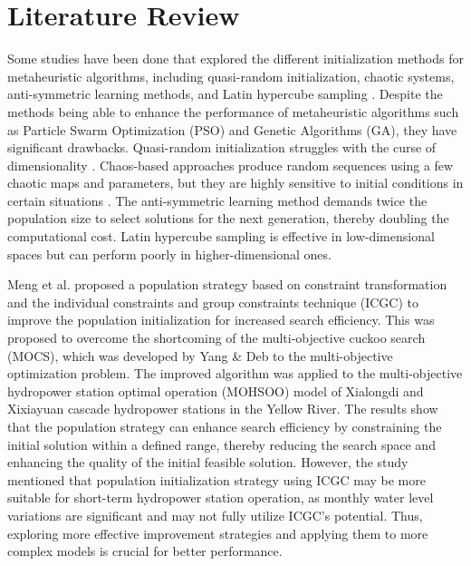 \section{Literature Review}
Some studies have been done that explored the different initialization methods for metaheuristic algorithms, including quasi-random initialization, chaotic systems, anti-symmetric learning methods, and Latin hypercube sampling \cite{li2020influence}. Despite the methods being able to enhance the performance of metaheuristic algorithms such as Particle Swarm Optimization (PSO) and Genetic Algorithms (GA), they have significant drawbacks. Quasi-random initialization struggles with the curse of dimensionality \cite{maaranen2004quasi}. Chaos-based approaches produce random sequences using a few chaotic maps and parameters, but they are highly sensitive to initial conditions in certain situations \cite{dos2008use}. The anti-symmetric learning method demands twice the population size to select solutions for the next generation, thereby doubling the computational cost. Latin hypercube sampling is effective in low-dimensional spaces but can perform poorly in higher-dimensional ones.

Meng et al. \cite{meng2019multi} proposed a population strategy based on constraint transformation and the individual constraints and group constraints technique (ICGC) to improve the population initialization for increased search efficiency. This was proposed to overcome the shortcoming of the multi-objective cuckoo search (MOCS), which was developed by Yang \& Deb \cite{yang2013multiobjective} to the multi-objective optimization problem. The improved algorithm was applied to the multi-objective hydropower station optimal operation (MOHSOO) model of Xialongdi and Xixiayuan cascade hydropower stations in the Yellow River. The results show that the population strategy can enhance search efficiency by constraining the initial solution within a defined range, thereby reducing the search space and enhancing the quality of the initial feasible solution. However, the study mentioned that population initialization strategy using ICGC may be more suitable for short-term hydropower station operation, as monthly water level variations are significant and may not fully utilize ICGC's potential. Thus, exploring more effective improvement strategies and applying them to more complex models is crucial for better performance.

